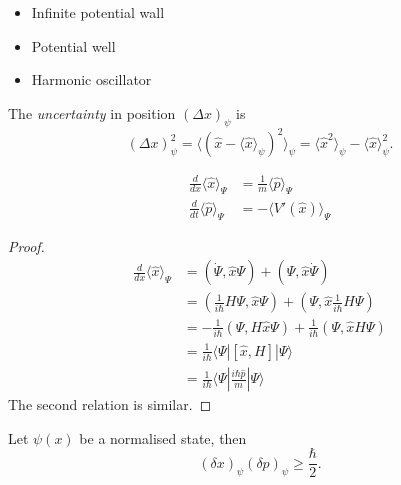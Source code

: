 \documentclass[a4paper]{article}
\theoremstyle{definition}
\begin{document}
\begin{eg}\leavevmode
\begin{itemize}
\item Infinite potential wall
\item Potential well
\item Harmonic oscillator
\end{itemize}
\end{eg}

\begin{defi}[Uncertainty]
  The \emph{uncertainty} in position \((\Delta x)_\psi\) is
  \[
(\Delta x)_\psi^2 = \langle (\hat x - \langle \hat x \rangle_\psi)^2\rangle_\psi = \langle \hat x^2 \rangle_\psi - \langle \hat x\rangle_\psi^2.
  \]
\end{defi}

\begin{thm}
  \begin{align*}
    \frac{d}{dx} \langle \hat x\rangle_\Psi &= \frac{1}{m} \langle \hat p\rangle_\Psi \\
    \frac{d}{dt}\langle \hat p\rangle_\Psi &= - \langle V'(\hat x)\rangle_\Psi
  \end{align*}
\end{thm}

\begin{proof}
  \begin{align*}
    \frac{d}{dx}\langle\hat x\rangle_\Psi &= (\dot\Psi, \hat x \Psi) + (\Psi,\hat x\dot\Psi) \\
                                          &= (\frac{1}{i\hbar}H\Psi,\hat x\Psi) + (\Psi, \hat x \frac{1}{i\hbar}H\Psi) \\
                                          &= -\frac{1}{i\hbar}(\Psi,H\hat x\Psi) + \frac{1}{i\hbar}(\Psi, \hat x H \Psi) \\
                                          &= \frac{1}{i\hbar} \langle\Psi|[\hat x, H]|\Psi\rangle \\
                                          &= \frac{1}{i\hbar} \langle\Psi| \frac{i\hbar\hat p}{m}|\Psi\rangle
  \end{align*}
  The second relation is similar.
\end{proof}

\begin{thm}
  Let \(\psi(x)\) be a normalised state, then
  \[
(\delta x)_\psi (\delta p)_\psi \geq \frac{\hbar}{2}.
  \]
\end{thm}
\end{document}
